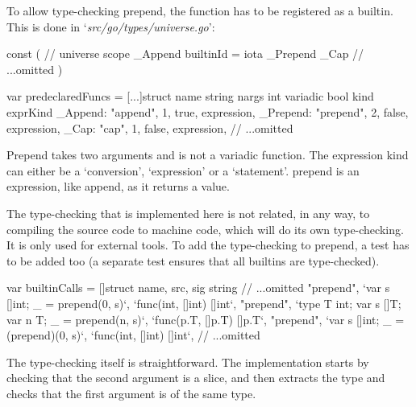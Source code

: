 To allow type-checking prepend, the function has to be registered as a builtin.
This is done in `\textit{src/go/types/universe.go}':

\begin{gocode}
const (
	// universe scope
	_Append builtinId = iota
	_Prepend
	_Cap
    // ...omitted
)

var predeclaredFuncs = [...]struct {
	name     string
	nargs    int
	variadic bool
	kind     exprKind
}{
	_Append:  {"append", 1, true, expression},
	_Prepend: {"prepend", 2, false, expression},
	_Cap:     {"cap", 1, false, expression},
    // ...omitted
}
\end{gocode}

Prepend takes two arguments and is not a variadic function. The expression kind can either be a `conversion',
`expression' or a `statement'. prepend is an expression, like append, as it returns a value.


The type-checking that is implemented here is not related, in any way, to compiling the source code to machine code, which will do its own type-checking. It is only used for external tools.
To add the type-checking to prepend, a test has to be added too (a separate
test ensures that all builtins are type-checked).

\begin{gocode}
var builtinCalls = []struct {
	name, src, sig string
}{
	// ...omitted
	{"prepend", `var s []int; _ = prepend(0, s)`, `func(int, []int) []int`},
	{"prepend", `type T int; var s []T; var n T; _ = prepend(n, s)`, `func(p.T, []p.T) []p.T`},
	{"prepend", `var s []int; _ = (prepend)(0, s)`, `func(int, []int) []int`},
    // ...omitted
}
\end{gocode}

The type-checking itself is straightforward. The implementation starts by checking that the second
argument is a slice, and then extracts the type and checks that the first argument is of the same type.

